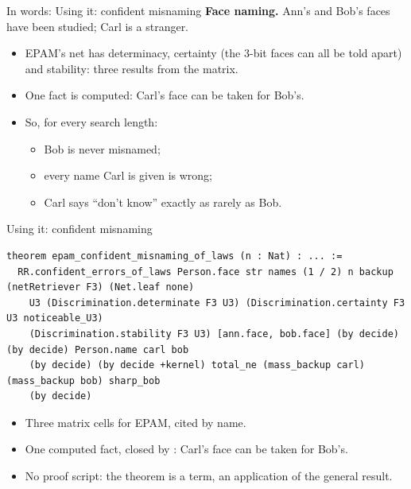 \documentclass[aspectratio=169,11pt]{beamer}
\begin{document}
\begin{frame}{In words: Using it: confident misnaming}
  \textbf{Face naming.} Ann's and Bob's faces have been studied; Carl is a stranger.
  \begin{itemize}
    \item EPAM's net has determinacy, certainty (the 3-bit faces can all be told apart) and stability: three results from the matrix.
    \item One fact is computed: Carl's face can be taken for Bob's.
    \item So, for every search length:
    \begin{itemize}
      \item Bob is never misnamed;
      \item every name Carl is given is wrong;
      \item Carl says ``don't know'' exactly as rarely as Bob.
    \end{itemize}
  \end{itemize}
\end{frame}


\begin{frame}[fragile]{Using it: confident misnaming}
\begin{Verbatim}
theorem epam_confident_misnaming_of_laws (n : Nat) : ... :=
  RR.confident_errors_of_laws Person.face str names (1 / 2) n backup (netRetriever F3) (Net.leaf none)
    U3 (Discrimination.determinate F3 U3) (Discrimination.certainty F3 U3 noticeable_U3)
    (Discrimination.stability F3 U3) [ann.face, bob.face] (by decide) (by decide) Person.name carl bob
    (by decide) (by decide +kernel) total_ne (mass_backup carl) (mass_backup bob) sharp_bob
    (by decide)
\end{Verbatim}
  \medskip
  \begin{itemize}\small
    \item Three matrix cells for EPAM, cited by name.
    \item One computed fact, closed by : Carl's face can be taken for Bob's.
    \item No proof script: the theorem is a term, an application of the general result.
  \end{itemize}
\end{frame}
\end{document}
